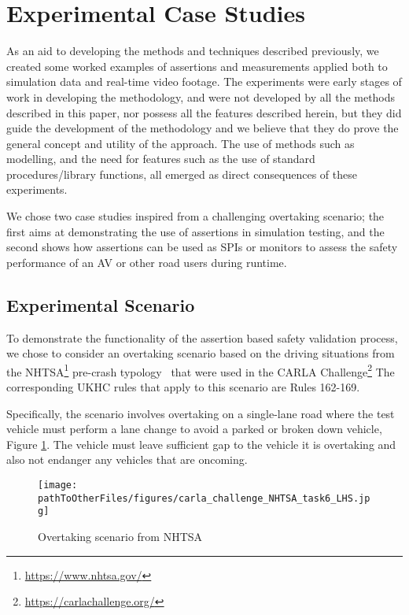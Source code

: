 \section{Experimental Case Studies} \label{Experimental_scenario}
As an aid to developing the methods and techniques described previously, we created some worked examples of assertions and measurements applied both to simulation data and real-time video footage. The experiments were early stages of work in developing the methodology, and were not developed by all the methods described in this paper, nor possess all the features described herein, but they did guide the development of the methodology and we believe that they do prove the general concept and utility of the approach. The use of methods such as modelling, and the need for features such as the use of standard procedures/library functions, all emerged as direct consequences of these experiments.

We chose two case studies inspired from a challenging overtaking scenario; the first aims at demonstrating the use of assertions in simulation testing, and the second shows how assertions can be used as SPIs or monitors to assess the safety performance of an AV or other road users during runtime.

\subsection{Experimental Scenario} %
\label{carla_challenge}
To demonstrate the functionality of the assertion based safety validation process, we chose to consider an overtaking scenario based on the driving situations from the NHTSA\footnote{\url{https://www.nhtsa.gov/}} pre-crash typology~\cite{nhtsa_precrash} that were used in the CARLA Challenge\footnote{\url{https://carlachallenge.org/}} The corresponding UKHC rules \cite{highwayCode} that apply to this scenario are Rules 162-169.

Specifically, the scenario involves overtaking on a single-lane road where the test vehicle must perform a lane change to avoid a parked or broken down vehicle, Figure \ref{fig:carla_challenge_NHTSA_task6_LHS}. The vehicle must leave sufficient gap to the vehicle it is overtaking and also not endanger any vehicles that are oncoming.

\begin{figure}
    \centering
    \texttt{[image: \\pathToOtherFiles/figures/carla\_challenge\_NHTSA\_task6\_LHS.jpg]}
    \caption{Overtaking scenario from NHTSA~\cite{nhtsa_precrash}}
    \label{fig:carla_challenge_NHTSA_task6_LHS}
\end{figure} 

